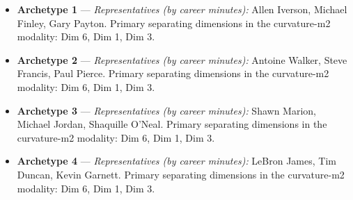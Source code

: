 \begin{itemize}
\item \textbf{Archetype 1} --- \emph{Representatives (by career minutes):} Allen Iverson, Michael Finley, Gary Payton. Primary separating dimensions in the curvature-m2 modality: Dim 6, Dim 1, Dim 3.
\item \textbf{Archetype 2} --- \emph{Representatives (by career minutes):} Antoine Walker, Steve Francis, Paul Pierce. Primary separating dimensions in the curvature-m2 modality: Dim 6, Dim 1, Dim 3.
\item \textbf{Archetype 3} --- \emph{Representatives (by career minutes):} Shawn Marion, Michael Jordan, Shaquille O'Neal. Primary separating dimensions in the curvature-m2 modality: Dim 6, Dim 1, Dim 3.
\item \textbf{Archetype 4} --- \emph{Representatives (by career minutes):} LeBron James, Tim Duncan, Kevin Garnett. Primary separating dimensions in the curvature-m2 modality: Dim 6, Dim 1, Dim 3.
\end{itemize}
